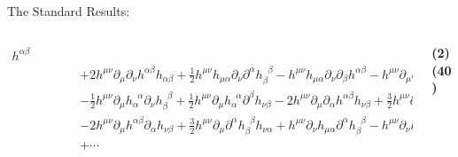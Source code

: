 \documentclass[aspectratio=169,usenames,dvipsnames]{beamer}
\begin{document}
\begin{frame}[t]{\centering {}\\ The Standard Results:}
{\begin{columns}
\begin{column}{0.85\textwidth}
\begin{alignat*}{3}
       h^{\alpha\beta} \\ & && &&
       + 2 h^{\mu\nu} \partial_{\mu}\partial_{\nu}h^{\alpha\beta} h_{\alpha\beta}
       + \frac{1}{2} h^{\mu\nu} h_{\mu\alpha} \partial_{\nu}\partial^{\alpha} h_{\beta}^{\;\;\beta}
       - h^{\mu\nu} h_{\mu\alpha} \partial_{\nu}\partial_{\beta}h^{\alpha\beta}
       - h^{\mu\nu} \partial_{\mu}\partial_{\alpha} h_{\nu\beta} h^{\alpha\beta} \\ & && &&
       - \frac{1}{2} h^{\mu\nu} \partial_{\mu} h_{\alpha}^{\;\;\alpha} \partial_{\nu} h_{\beta}^{\;\;\beta}
       + \frac{1}{2} h^{\mu\nu} \partial_{\mu} h_{\alpha}^{\;\;\alpha} \partial^{\beta} h_{\nu\beta}
       - 2 h^{\mu\nu} \partial_{\mu} \partial_{\alpha} h^{\alpha\beta} h_{\nu\beta}
       + \frac{3}{2} h^{\mu\nu} \partial_{\mu} h^{\alpha\beta} \partial_{\nu}
       h_{\alpha\beta} \\ & && &&
       - 2 h^{\mu\nu} \partial_{\mu} h^{\alpha\beta} \partial_{\alpha} h_{\nu\beta}
       + \frac{3}{2} h^{\mu\nu} \partial_{\mu}\partial^{\alpha}h_{\beta}^{\;\;\beta} h_{\nu\alpha}
       + h^{\mu\nu} \partial_{\nu} h_{\mu\alpha} \partial^{\alpha} h_{\beta}^{\;\;\beta}
       - h^{\mu\nu} \partial_{\nu} h_{\mu\alpha} \partial_{\beta}
       h^{\alpha\beta} \\ & && &&
       + \cdots
\end{alignat*}    
  \end{column}
  \begin{column}{0.1\textwidth}
    \hfill {\bf{\textcolor{LUCopper}{\normalsize{(2)}}}} \\[30mm]
    \hfill {\bf\textcolor{LUCopper}{\normalsize{(40)}}} 
    \vspace{32mm}
  \end{column}
\end{columns}}


\end{frame}
\end{document}
